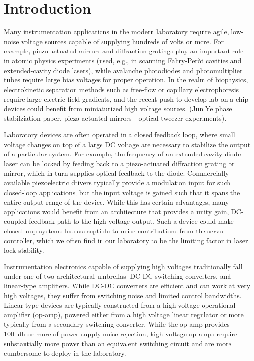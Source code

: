 \documentclass[aip,rsi,reprint]{revtex4-1} %
\begin{document}
\section{Introduction}
\label{Sec:Introduction}

Many instrumentation applications in the modern laboratory require agile, low-noise voltage sources capable of supplying hundreds of volts or more.
For example, piezo-actuated mirrors and diffraction gratings play an important role in atomic physics experiments (used, e.g., in scanning Fabry-Per{\`o}t cavities\cite{REF} and extended-cavity diode lasers\cite{REF, also LIGO?}), while avalanche photodiodes and photomultiplier tubes require large bias voltages for proper operation. 
In the realm of biophysics, electrokinetic separation methods such as free-flow or capillary electrophoresis\cite{Kohlheyer2008a} require large electric field gradients, and the recent push to develop lab-on-a-chip devices could benefit from miniaturized high voltage sources\cite{REF}.
(Jun Ye phase stabilziation paper, piezo actuated mirrors - optical tweezer experiments).

Laboratory devices are often operated in a closed feedback loop, where small voltage changes on top of a large DC voltage are necessary to stabilize the output of a particular system.
For example, the frequency of an extended-cavity diode laser can be locked by feeding back to a piezo-actuated diffraction grating or mirror, which in turn supplies optical feedback to the diode.
Commercially available piezoelectric drivers typically provide a modulation input for  such closed-loop applications, but the input voltage is gained such that it spans the entire output range of the device.
While this has certain advantages, many applications would benefit from an architecture that provides a unity gain, DC-coupled feedback path to the high voltage output. 
Such a device could make closed-loop systems less susceptible to noise contributions from the servo controller, which we often find in our laboratory to be the limiting factor in laser lock stability.

Instrumentation electronics capable of supplying high voltages traditionally fall under one of two architectural umbrellas: DC-DC switching converters, and linear-type amplifiers.
While DC-DC converters are efficient and can work at very high voltages, they suffer from switching noise and limited control bandwidths.
Linear-type devices are typically constructed from a high-voltage operational amplifier (op-amp), powered either from a high voltage linear regulator or more typically from a secondary switching converter.
While the op-amp provides \SI{100}{\decibel} or more of power-supply noise rejection, high-voltage op-amps require substantially more power than an equivalent switching circuit and are more cumbersome to deploy in the laboratory.
\end{document}

